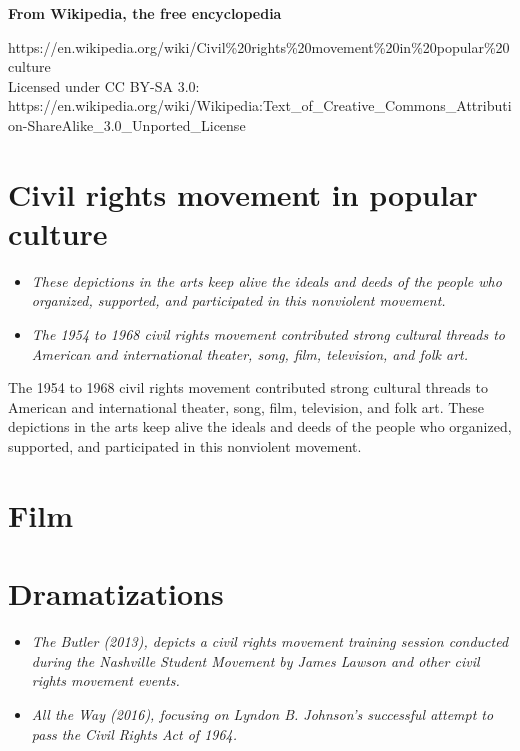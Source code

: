 \textbf{From Wikipedia, the free encyclopedia}

https://en.wikipedia.org/wiki/Civil\%20rights\%20movement\%20in\%20popular\%20culture\\
Licensed under CC BY-SA 3.0:\\
https://en.wikipedia.org/wiki/Wikipedia:Text\_of\_Creative\_Commons\_Attribution-ShareAlike\_3.0\_Unported\_License

\section{Civil rights movement in popular
culture}\label{civil-rights-movement-in-popular-culture}

\begin{itemize}
\item
  \emph{These depictions in the arts keep alive the ideals and deeds of
  the people who organized, supported, and participated in this
  nonviolent movement.}
\item
  \emph{The 1954 to 1968 civil rights movement contributed strong
  cultural threads to American and international theater, song, film,
  television, and folk art.}
\end{itemize}

The 1954 to 1968 civil rights movement contributed strong cultural
threads to American and international theater, song, film, television,
and folk art. These depictions in the arts keep alive the ideals and
deeds of the people who organized, supported, and participated in this
nonviolent movement.

\section{Film}\label{film}

\section{Dramatizations}\label{dramatizations}

\begin{itemize}
\item
  \emph{The Butler (2013), depicts a civil rights movement training
  session conducted during the Nashville Student Movement by James
  Lawson and other civil rights movement events.}
\item
  \emph{All the Way (2016), focusing on Lyndon B. Johnson's successful
  attempt to pass the Civil Rights Act of 1964.}
\end{itemize}

